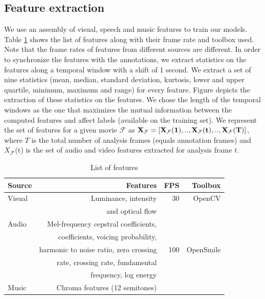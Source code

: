 \documentclass{article}
\begin{document}
\subsection{Feature extraction} \label{feature_extraction}
We use an assembly of visual, speech and music features to train our models.
Table \ref{table:features} shows the list of features along with their frame rate and toolbox used. 
Note that the frame rates of features from different sources are different.
In order to synchronize the features with the annotations, we extract statistics on the features along a temporal window with a shift of 1 second. 
We extract a set of nine statistics (mean, median, standard deviation, kurtosis, lower and upper quartile, minimum, maximum and range) for every feature. 
Figure \cite{} depicts the extraction of these statistics on the features.
We chose the length of the temporal windows as the one that maximizes the mutual information between the computed features and affect labels (available on the training set).
We represent the set of features for a given movie $\mathcal{F}$ as $\bf X_{\mathcal{F}} = [X_{\mathcal{F}}(1), .., X_{\mathcal{F}}(t), .., X_{\mathcal{F}}(T) ]$, where $T$ is the total number of analysis frames (equals annotation frames) and $X_{\mathcal{F}}$(t) is the set of audio and video features extracted for analysis frame $t$. 

\begin{table}[t]
\centering
\begin{tabular}{|@{}l@{}|r|r|r@{}|}
\hline
{\bf Source} &{\bf Features} & {\bf FPS} & {\bf Toolbox} \\ \hline
Visual & Luminance, intensity & 30 & OpenCV \\ 
       & and optical flow & & \cite{} \\ \hline
Audio & Mel-frequency cepstral coefficients,& & \\
               & coefficients, voicing probability, & & \\  
               & harmonic to noise ratio, zero crossing & 100 & OpenSmile \\  
               & rate, crossing rate, fundamental & &\cite{} \\  
               & frequency, log energy & & \\ \cline{1-2}
Music & Chroma features (12 semitones) & & \\ \hline
\end{tabular}
\caption{List of features}
\label{table:features}
\end{table}
\end{document}
